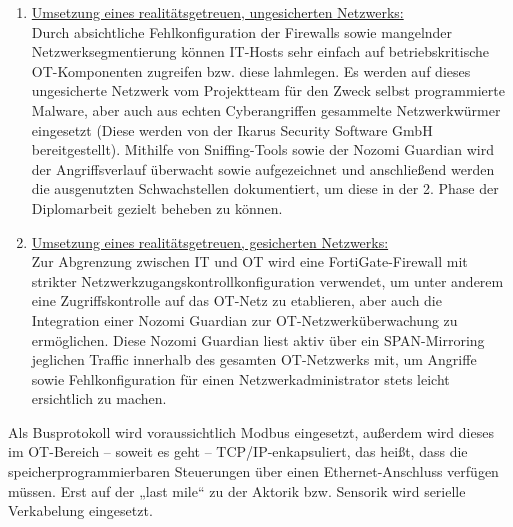 \documentclass[
	headings=optiontotocandhead,%
	oneside,
	numbers=noenddot,%
	toc=flat, %
	10pt, %
	parskip=full, %
	listof=totoc, %
	listof=flat, %
	numbers=noenddot, %
	bibliography=totoc, %
	a4paper,DIV=14,
]{scrartcl}
\begin{document}
\begin{enumerate}
\item \underline{Umsetzung eines realitätsgetreuen, ungesicherten Netzwerks:}\\
Durch absichtliche Fehlkonfiguration der Firewalls sowie mangelnder Netzwerksegmentierung können IT-Hosts sehr einfach auf betriebskritische OT-Komponenten zugreifen bzw. diese lahmlegen. Es werden auf dieses ungesicherte Netzwerk vom Projektteam für den Zweck selbst programmierte Malware, aber auch aus echten Cyberangriffen gesammelte Netzwerkwürmer eingesetzt (Diese werden von der Ikarus Security Software GmbH bereitgestellt). Mithilfe von Sniffing-Tools sowie der Nozomi Guardian wird der Angriffsverlauf überwacht sowie aufgezeichnet und anschließend werden die ausgenutzten Schwachstellen dokumentiert, um diese in der 2. Phase der Diplomarbeit gezielt beheben zu können.

\item \underline{Umsetzung eines realitätsgetreuen, gesicherten Netzwerks:}\\
Zur Abgrenzung zwischen IT und OT wird eine FortiGate-Firewall mit strikter Netzwerkzugangskontrollkonfiguration verwendet, um unter anderem eine Zugriffskontrolle auf das OT-Netz zu etablieren, aber auch die Integration einer Nozomi Guardian zur OT-Netzwerküberwachung zu ermöglichen. Diese Nozomi Guardian liest aktiv über ein SPAN-Mirroring jeglichen Traffic innerhalb des gesamten OT-Netzwerks mit, um Angriffe sowie Fehlkonfiguration für einen Netzwerkadministrator stets leicht ersichtlich zu machen.

\end{enumerate}
Als Busprotokoll wird voraussichtlich Modbus eingesetzt, außerdem wird dieses im OT-Bereich – soweit es geht – TCP/IP-enkapsuliert, das heißt, dass die speicherprogrammierbaren Steuerungen über einen Ethernet-Anschluss verfügen müssen. Erst auf der „last mile“ zu der Aktorik bzw. Sensorik wird serielle Verkabelung eingesetzt.
\end{document}
